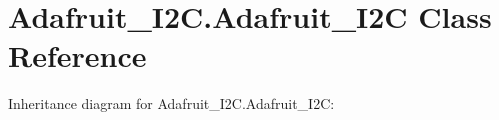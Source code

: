 \hypertarget{classAdafruit__I2C_1_1Adafruit__I2C}{}\section{Adafruit\+\_\+\+I2\+C.\+Adafruit\+\_\+\+I2C Class Reference}
\label{classAdafruit__I2C_1_1Adafruit__I2C}


Inheritance diagram for Adafruit\+\_\+\+I2\+C.\+Adafruit\+\_\+\+I2C\+:
